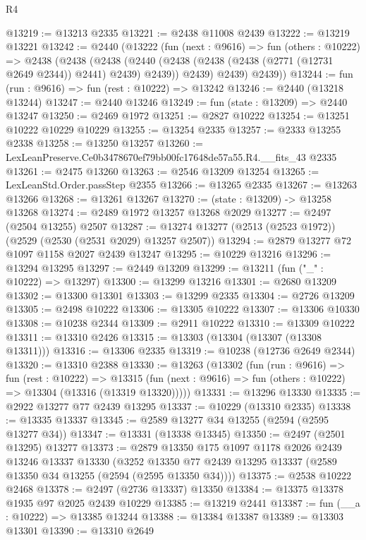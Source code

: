 \begin{lexlean}{R4}
\begin{coremodule}
@13219 := @13213 @2335
@13221 := @2438 @11008 @2439
@13222 := @13219 @13221
@13242 := @2440
    (@13222
      (fun (next : @9616) =>
      fun (others : @10222) =>
      @2438
        (@2438
          (@2438
            (@2440 (@2438 (@2438 (@2438 (@2771 (@12731 @2649 @2344)) @2441) @2439) @2439))
            @2439)
          @2439)
        @2439))
@13244 := fun (run : @9616) => fun (rest : @10222) => @13242
@13246 := @2440 (@13218 @13244)
@13247 := @2440 @13246
@13249 := fun (state : @13209) => @2440 @13247
@13250 := @2469 @1972
@13251 := @2827 @10222
@13254 := @13251 @10222 @10229 @10229
@13255 := @13254 @2335
@13257 := @2333 @13255 @2338
@13258 := @13250 @13257
@13260 := LexLeanPreserve.Ce0b3478670ef79bb00fc17648de57a55.R4.__fits_43 @2335
@13261 := @2475 @13260
@13263 := @2546 @13209 @13254
@13265 := LexLeanStd.Order.passStep @2355
@13266 := @13265 @2335
@13267 := @13263 @13266
@13268 := @13261 @13267
@13270 := (state : @13209) -> @13258 @13268
@13274 := @2489 @1972 @13257 @13268 @2029
@13277 := @2497 (@2504 @13255) @2507
@13287 := @13274 @13277 (@2513 (@2523 @1972)) (@2529 (@2530 (@2531 @2029) @13257 @2507))
@13294 := @2879 @13277 @72 @1097 @1158 @2027 @2439 @13247
@13295 := @10229 @13216
@13296 := @13294 @13295
@13297 := @2449 @13209
@13299 := @13211 (fun ("_" : @10222) => @13297)
@13300 := @13299 @13216
@13301 := @2680 @13209
@13302 := @13300 @13301
@13303 := @13299 @2335
@13304 := @2726 @13209
@13305 := @2498 @10222
@13306 := @13305 @10222
@13307 := @13306 @10330
@13308 := @10238 @2344
@13309 := @2911 @10222
@13310 := @13309 @10222
@13311 := @13310 @2426
@13315 := @13303 (@13304 (@13307 (@13308 @13311)))
@13316 := @13306 @2335
@13319 := @10238 (@12736 @2649 @2344)
@13320 := @13310 @2388
@13330 := @13263
    (@13302
      (fun (run : @9616) =>
      fun (rest : @10222) =>
      @13315 (fun (next : @9616) => fun (others : @10222) => @13304 (@13316 (@13319 @13320)))))
@13331 := @13296 @13330
@13335 := @2922 @13277 @77 @2439 @13295
@13337 := @10229 (@13310 @2335)
@13338 := @13335 @13337
@13345 := @2589 @13277 @34 @13255 (@2594 (@2595 @13277 @34))
@13347 := @13331 (@13338 @13345)
@13350 := @2497 (@2501 @13295) @13277
@13373 := @2879
    @13350
    @175
    @1097
    @1178
    @2026
    @2439
    @13246
    @13337
    @13330
    (@3252 @13350 @77 @2439 @13295 @13337 (@2589 @13350 @34 @13255 (@2594 (@2595 @13350 @34))))
@13375 := @2538 @10222 @2468
@13378 := @2497 (@2736 @13337) @13350
@13384 := @13375 @13378 @1935 @97 @2025 @2439 @10229
@13385 := @13219 @2441
@13387 := fun (__a : @10222) => @13385 @13244
@13388 := @13384 @13387
@13389 := @13303 @13301
@13390 := @13310 @2649

\end{coremodule}
\end{lexlean}
